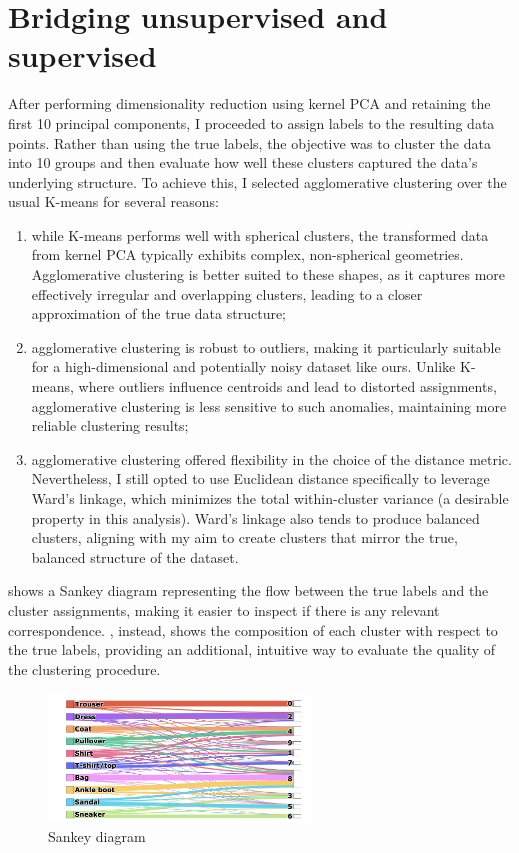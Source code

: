 \section{Bridging unsupervised and supervised}\label{clustering}
After performing dimensionality reduction using kernel PCA and retaining the first 10 principal components, I proceeded to assign labels 
to the resulting data points. Rather than using the true labels, the objective was to cluster the data into 10 groups and then evaluate how well these clusters captured the 
data's underlying structure. To achieve this, I selected agglomerative clustering over the usual K-means for several reasons:
\begin{enumerate}
    \item while K-means performs well with spherical clusters, the transformed data from kernel PCA typically exhibits complex, non-spherical geometries. 
    Agglomerative clustering is better suited to these shapes, as it captures more effectively irregular and overlapping clusters, leading to a closer 
    approximation of the true data structure;
    \item  agglomerative clustering is robust to outliers, making it particularly suitable for a high-dimensional and potentially noisy dataset like ours. 
    Unlike K-means, where outliers influence centroids and lead to distorted assignments, agglomerative clustering is less sensitive to such anomalies, maintaining more reliable clustering results;
    \item agglomerative clustering offered flexibility in the choice of the distance metric. Nevertheless, I still opted to use Euclidean distance specifically to 
    leverage Ward’s linkage, which minimizes the total within-cluster variance (a desirable property in this analysis). Ward’s linkage also tends to produce balanced clusters, 
    aligning with my aim to create clusters that mirror the true, balanced structure of the dataset.
\end{enumerate}

 shows a Sankey diagram representing the flow between the true labels and the cluster assignments, 
making it easier to inspect if there is any relevant correspondence. , instead, shows the composition of each cluster with respect to the true labels, providing an additional, intuitive way to evaluate 
the quality of the clustering procedure.
\begin{figure}[ht]
    \centering
    \includegraphics[width=0.62\textwidth]{images/sankey_diagram.png}
    \caption{\footnotesize Sankey diagram}
    \label{fig:sankey_diagram}
\end{figure}

